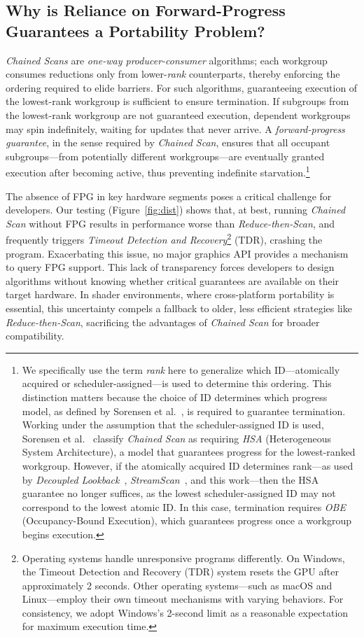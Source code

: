 \documentclass[sigconf,screen]{acmart}
\begin{document}
\subsection{Why is Reliance on Forward-Progress Guarantees a Portability Problem?}
\emph{Chained Scans} are \emph{one-way producer-consumer} algorithms; each workgroup consumes reductions only from lower-\emph{rank} counterparts, thereby enforcing the ordering required to elide barriers. For such algorithms, guaranteeing execution of the lowest-rank workgroup is sufficient to ensure termination. If subgroups from the lowest-rank workgroup are not guaranteed execution, dependent workgroups may spin indefinitely, waiting for updates that never arrive. A \emph{forward-progress guarantee}, in the sense required by \emph{Chained Scan}, ensures that all occupant subgroups---from potentially different workgroups---are eventually granted execution after becoming active, thus preventing indefinite starvation.\footnote{We specifically use the term \emph{rank} here to generalize which ID---atomically acquired or scheduler-assigned---is used to determine this ordering. This distinction matters because the choice of ID determines which progress model, as defined by Sorensen et al.~\cite{sorensen2021}, is required to guarantee termination. Working under the assumption that the scheduler-assigned ID is used, Sorensen et al.~\cite{sorensen2021, sorensen2018} classify \emph{Chained Scan} as requiring \emph{HSA} (Heterogeneous System Architecture), a model that guarantees progress for the lowest-ranked workgroup. However, if the atomically acquired ID determines rank---as used by \emph{Decoupled Lookback}~\cite[Section 4.4]{Merrill2016}, \emph{StreamScan}~\cite[Section 3.3.4]{10.1145/2442516.2442539}, and this work---then the HSA guarantee no longer suffices, as the lowest scheduler-assigned ID may not correspond to the lowest atomic ID. In this case, termination requires \emph{OBE} (Occupancy-Bound Execution), which guarantees progress once a workgroup begins execution.}

The absence of FPG in key hardware segments poses a critical challenge for developers. Our testing (Figure~\ref{fig:dist}) shows that, at best, running \emph{Chained Scan} without FPG results in performance worse than \emph{Reduce-then-Scan}, and frequently triggers \emph{Timeout Detection and Recovery}\label{sec:tdr}\footnote{Operating systems handle unresponsive programs differently. On Windows, the Timeout Detection and Recovery (TDR) system resets the GPU after approximately 2 seconds. Other operating systems---such as macOS and Linux---employ their own timeout mechanisms with varying behaviors. For consistency, we adopt Windows’s 2-second limit as a reasonable expectation for maximum execution time.} (TDR), crashing the program. Exacerbating this issue, no major graphics API provides a mechanism to query FPG support. This lack of transparency forces developers to design algorithms without knowing whether critical guarantees are available on their target hardware. In shader environments, where cross-platform portability is essential, this uncertainty compels a fallback to older, less efficient strategies like \emph{Reduce-then-Scan}, sacrificing the advantages of \emph{Chained Scan} for broader compatibility.
\end{document}
